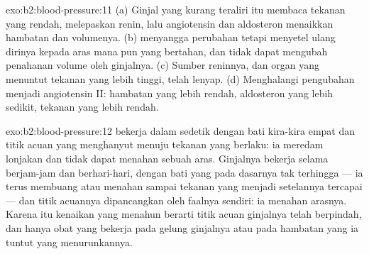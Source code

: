 \begin{solution}{exo:b2:blood-pressure:11}
(a) Ginjal yang kurang teraliri itu membaca tekanan yang rendah,
melepaskan renin, lalu angiotensin dan aldosteron menaikkan hambatan
dan volumenya. (b)  menyangga perubahan tetapi menyetel
ulang dirinya kepada aras mana pun yang bertahan, dan tidak dapat
mengubah penahanan volume oleh ginjalnya. (c) Sumber reninnya, dan
organ yang menuntut tekanan yang lebih tinggi, telah lenyap. (d)
Menghalangi pengubahan menjadi angiotensin II: hambatan yang lebih
rendah, aldosteron yang lebih sedikit, tekanan yang lebih rendah.
\end{solution}

\begin{solution}{exo:b2:blood-pressure:12}
 bekerja dalam sedetik dengan bati kira-kira empat dan
titik acuan yang menghanyut menuju tekanan yang berlaku: ia meredam
lonjakan dan tidak dapat menahan sebuah aras. Ginjalnya bekerja selama
berjam-jam dan berhari-hari, dengan bati yang pada dasarnya tak
terhingga --- ia terus membuang atau menahan sampai tekanan yang
menjadi setelannya tercapai --- dan titik acuannya dipancangkan oleh
faalnya sendiri: ia menahan arasnya. Karena itu kenaikan yang menahun
berarti titik acuan ginjalnya telah berpindah, dan hanya obat yang
bekerja pada gelung ginjalnya atau pada hambatan yang ia tuntut yang
menurunkannya.
\end{solution}

